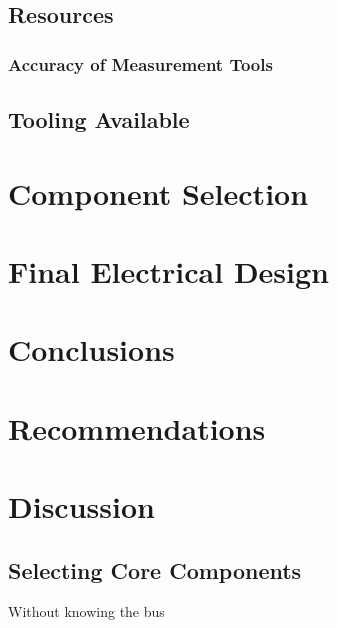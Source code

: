\documentclass[12pt]{article}
\begin{document}
	\subsection{Resources}
  \subsubsection{Accuracy of Measurement Tools}
	\subsection{Tooling Available}
	
	\section{Component Selection}
	
	\section{Final Electrical Design}

  \section{Conclusions}

  \section{Recommendations}

  \section{Discussion}

  \subsection{Selecting Core Components\label{sec:select-core-comp}}

  Without knowing the bus 
	
	
    \printglossaries
    
    \printbibliography[heading=bibintoc]
	
\end{document}
